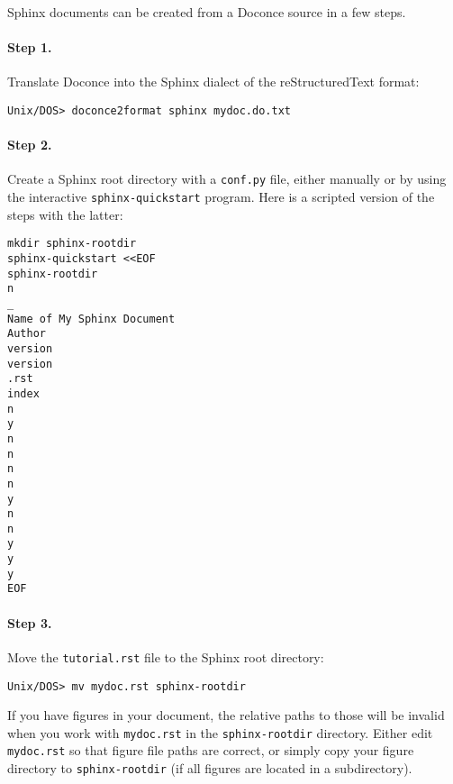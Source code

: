 \documentclass{article}
\begin{document}
Sphinx documents can be created from a Doconce source in a few steps.

\paragraph{Step 1.}
Translate Doconce into the Sphinx dialect of
the reStructuredText format:
\vspace{4pt}
\begin{Verbatim}[numbers=none,frame=lines,label=\fbox{{\tiny Terminal}},fontsize=\fontsize{9pt}{9pt},
labelposition=topline,framesep=2.5mm,framerule=0.7pt]
Unix/DOS> doconce2format sphinx mydoc.do.txt
\end{Verbatim}

\paragraph{Step 2.}
Create a Sphinx root directory with a {\fontsize{10pt}{10pt}\verb!conf.py!} file, 
either manually or by using the interactive {\fontsize{10pt}{10pt}\verb!sphinx-quickstart!}
program. Here is a scripted version of the steps with the latter:
\vspace{4pt}
\begin{Verbatim}[numbers=none,frame=lines,label=\fbox{{\tiny Terminal}},fontsize=\fontsize{9pt}{9pt},
labelposition=topline,framesep=2.5mm,framerule=0.7pt]
mkdir sphinx-rootdir
sphinx-quickstart <<EOF
sphinx-rootdir
n
_
Name of My Sphinx Document
Author
version
version
.rst
index
n
y
n
n
n
n
y
n
n
y
y
y
EOF
\end{Verbatim}

\paragraph{Step 3.}
Move the {\fontsize{10pt}{10pt}\verb!tutorial.rst!} file to the Sphinx root directory:
\vspace{4pt}
\begin{Verbatim}[numbers=none,frame=lines,label=\fbox{{\tiny Terminal}},fontsize=\fontsize{9pt}{9pt},
labelposition=topline,framesep=2.5mm,framerule=0.7pt]
Unix/DOS> mv mydoc.rst sphinx-rootdir
\end{Verbatim}
If you have figures in your document, the relative paths to those will
be invalid when you work with {\fontsize{10pt}{10pt}\verb!mydoc.rst!} in the {\fontsize{10pt}{10pt}\verb!sphinx-rootdir!}
directory. Either edit {\fontsize{10pt}{10pt}\verb!mydoc.rst!} so that figure file paths are correct,
or simply copy your figure directory to {\fontsize{10pt}{10pt}\verb!sphinx-rootdir!} (if all figures
are located in a subdirectory).
\end{document}
